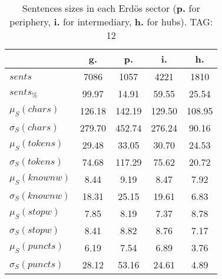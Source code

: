 \begin{table}[h!]
\begin{center}
\begin{tabular}{| l | c | c | c | c |}\hline
 & g. & p. & i. & h. \\\hline
$sents$ & 7086  & 1057  & 4221  & 1810 \\\hline
$sents_{\%}$ & 99.97  & 14.91  & 59.55  & 25.54 \\\hline
$\mu_S(chars)$ & 126.18  & 142.19  & 129.50  & 108.95 \\\hline
$\sigma_S(chars)$ & 279.70  & 452.74  & 276.24  & 90.16 \\\hline
$\mu_S(tokens)$ & 29.48  & 33.05  & 30.70  & 24.53 \\\hline
$\sigma_S(tokens)$ & 74.68  & 117.29  & 75.62  & 20.72 \\\hline
$\mu_S(knownw)$ & 8.44  & 9.19  & 8.47  & 7.92 \\\hline
$\sigma_S(knownw)$ & 18.31  & 25.15  & 19.61  & 6.83 \\\hline
$\mu_S(stopw)$ & 7.85  & 8.19  & 7.37  & 8.78 \\\hline
$\sigma_S(stopw)$ & 8.41  & 8.82  & 8.76  & 7.17 \\\hline
$\mu_S(puncts)$ & 6.19  & 7.54  & 6.89  & 3.76 \\\hline
$\sigma_S(puncts)$ & 28.12  & 53.16  & 24.61  & 4.89 \\\hline
\end{tabular}
\caption{Sentences sizes in each Erd\"os sector ({{\bf p.}} for periphery, {{\bf i.}} for intermediary, {{\bf h.}} for hubs). TAG: 12}
\end{center}
\end{table}